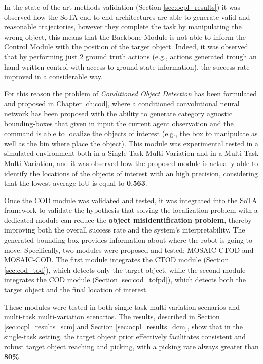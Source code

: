 In the state-of-the-art methods validation (Section \ref{sec:ocpl_results}) it was observed how the SoTA end-to-end architectures are able to generate valid and reasonable trajectories, however they complete the task by manipulating the wrong object, this means that the Backbone Module is not able to inform the Control Module with the position of the target object. Indeed, it was observed that by performing just 2 ground truth actions (e.g., actions generated trough an hand-written control with access to ground state information), the success-rate improved in a considerable way.

For this reason the problem of \textit{Conditioned Object Detection} has been formulated and proposed in Chapter \ref{ch:cod}, where a conditioned convolutional neural network has been proposed with the ability to generate category agnostic bounding-boxes that given in input the current agent observation and the command is able to localize the objects of interest (e.g., the box to manipulate as well as the bin where place the object). This module was experimental tested in a simulated environment both in a Single-Task Multi-Variation and in a Multi-Task Multi-Variation, and it was observed how the proposed module is actually able to identify the locations of the objects of interest with an high precision, considering that the lowest average IoU is equal to \textbf{0.563}. 

Once the COD module was validated and tested, it was integrated into the SoTA framework to validate the hypothesis that solving the localization problem with a dedicated module can reduce the \textbf{object misidentification problem}, thereby improving both the overall success rate and the system's interpretability. The generated bounding box provides information about where the robot is going to move. Specifically, two modules were proposed and tested: MOSAIC-CTOD and MOSAIC-COD. The first module integrates the CTOD module (Section \ref{sec:cod_tod}), which detects only the target object, while the second module integrates the COD module (Section \ref{sec:cod_tofpd}), which detects both the target object and the final location of interest.

These modules were tested in both single-task multi-variation scenarios and multi-task multi-variation scenarios. The results, described in Section \ref{sec:ocpl_results_scm} and Section \ref{sec:ocpl_results_dcm}, show that in the single-task setting, the target object prior effectively facilitates consistent and robust target object reaching and picking, with a picking rate always greater than \textbf{80\%}. 

